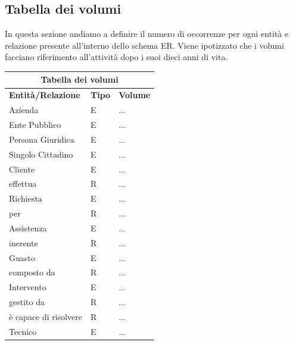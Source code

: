 \documentclass[legalpaper]{article}
\begin{document}
	\subsection{Tabella dei volumi}
		In questa sezione andiamo a definire il numero di occorrenze per ogni entità e relazione presente all'interno dello schema ER. Viene ipotizzato che i volumi facciano riferimento all'attività dopo i suoi dieci anni di vita.\\
		\newline
		\renewcommand\arraystretch{2}
		\begin{tabular}{ |p{5cm}|p{2cm}|p{5cm}| }
			\hline
			\multicolumn{3}{|c|}{\textbf{Tabella dei volumi}} \\
			\hline
			\textbf{Entità/Relazione} & \textbf{Tipo} & \textbf{Volume} \\
			\hline
			Azienda & E & ... \\ \hline
			Ente Pubblico & E & ... \\ \hline
			Persona Giuridica & E & ... \\ \hline
			Singolo Cittadino & E & ... \\ \hline
			Cliente & E & ... \\ \hline
			effettua & R & ... \\ \hline
			Richiesta & E & ... \\ \hline
			per & R & ... \\ \hline
			Assistenza & E & ... \\ \hline
			inerente & R & ... \\ \hline
			Guasto & E & ... \\ \hline
			composto da & R & ... \\ \hline
			Intervento & E & ... \\ \hline
			gestito da & R & ... \\ \hline
			è capace di risolvere & R & ... \\ \hline
			Tecnico & E & ... \\ \hline
		\end{tabular}

	
\end{document}
